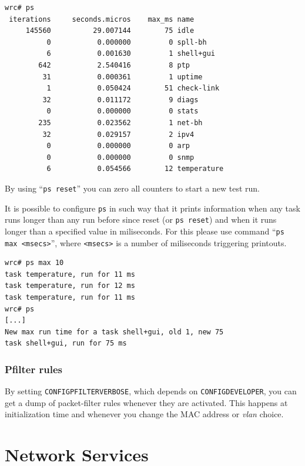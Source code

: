 \documentclass[a4paper, 12pt]{article}
\renewcommand{\_}{\underscore\allowbreak}
\begin{document}
\begin{lstlisting}
wrc# ps
 iterations     seconds.micros    max_ms name
     145560          29.007144        75 idle
          0           0.000000         0 spll-bh
          6           0.001630         1 shell+gui
        642           2.540416         8 ptp
         31           0.000361         1 uptime
          1           0.050424        51 check-link
         32           0.011172         9 diags
          0           0.000000         0 stats
        235           0.023562         1 net-bh
         32           0.029157         2 ipv4
          0           0.000000         0 arp
          0           0.000000         0 snmp
          6           0.054566        12 temperature
\end{lstlisting}

By using ``\texttt{ps reset}'' you can zero all counters to start a new
test run.

It is possible to configure \texttt{ps} in such way that it prints information
when any task runs longer than any run before since reset
(or \texttt{ps reset}) and when it runs longer than a specified value
in miliseconds.
For this please use command ``\texttt{ps max <msecs>}'', where
\texttt{<msecs>} is a number of miliseconds triggering printouts.
\begin{lstlisting}
wrc# ps max 10
task temperature, run for 11 ms
task temperature, run for 12 ms
task temperature, run for 11 ms
wrc# ps
[...]
New max run time for a task shell+gui, old 1, new 75
task shell+gui, run for 75 ms
\end{lstlisting}

\subsubsection{Pfilter rules}
\label{Pfilter rules}

By setting \texttt{CONFIG\_PFILTER\_VERBOSE}, which depends on
\texttt{CONFIG\_DEVELOPER}, you can get a dump of packet-filter rules
whenever they are activated.  This happens at initialization time and
whenever you change the MAC address or \textit{vlan} choice.

\newpage
\section{Network Services}
\label{Network Services}
\end{document}
